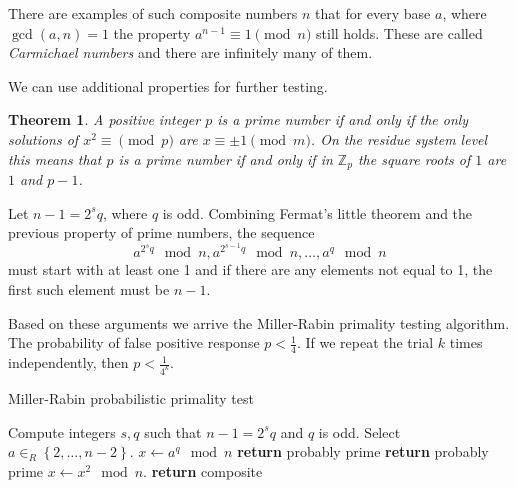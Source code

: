 \documentclass{article}
\newcommand{\Z}{\mathbb{Z}}
\newtheorem{theorem}{Theorem}
\begin{document}
There are examples of such composite numbers $n$ that for every base $a$, where $\gcd(a,n)=1$ the property $a^{n-1} \equiv 1 \pmod{n}$ still holds.
These are called \emph{Carmichael numbers} and there are infinitely many of them.

We can use additional properties for further testing.

\begin{theorem}
    A positive integer $p$ is a prime number if and only if the only solutions of $x^2 \equiv \pmod{p}$ are $x \equiv \pm 1 \pmod{m}$.
    On the residue system level this means that $p$ is a prime number if and only if in $\Z_p$ the square roots of $1$ are $1$ and $p-1$.
\end{theorem}

Let $n-1 = 2^s q$, where $q$ is odd. Combining Fermat's little theorem and the previous property of prime numbers, the sequence
\[
    a^{2^s q} \mod n, a^{2^{s-1} q} \mod n, \ldots, a^q \mod n
\]
must start with at least one 1 and if there are any elements not equal to 1, the first such element must be $n-1$.

Based on these arguments we arrive the Miller-Rabin primality testing algorithm.
The probability of false positive response $p < \frac{1}{4}$. If we repeat the trial $k$ times independently, then $p < \frac{1}{4^k}$.

\begin{algorithm}
    \caption{Miller-Rabin probabilistic primality test}
    \label{alg:miller-rabin}
    \begin{algorithmic}[1]
            \State Compute integers $s, q$ such that $n-1=2^s q$ and $q$ is odd.
            \State Select $a \in_R \left \{ 2,\ldots,n-2 \right \}$.
            \State $x \gets a^q \mod n$
                \State \textbf{return} probably prime
            \EndIf
                    \State \textbf{return} probably prime
                \EndIf
                \State $x \gets x^2 \mod n$.
            \EndFor
            \State \textbf{return} composite
        \EndProcedure
    \end{algorithmic}
\end{algorithm}
\end{document}
